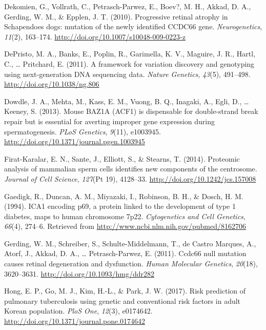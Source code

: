 \documentclass[12pt,twoside]{reedthesis}
\theoremstyle{definition}
\theoremstyle{definition}
\theoremstyle{remark}
\begin{document}
  \hypertarget{ref-Dekomien2010}{}
  Dekomien, G., Vollrath, C., Petrasch-Parwez, E., Boev?, M. H., Akkad, D.
  A., Gerding, W. M., \& Epplen, J. T. (2010). Progressive retinal atrophy
  in Schapendoes dogs: mutation of the newly identified CCDC66 gene.
  \emph{Neurogenetics}, \emph{11}(2), 163--174.
  \url{http://doi.org/10.1007/s10048-009-0223-z}
  
  \hypertarget{ref-DePristo2011}{}
  DePristo, M. A., Banks, E., Poplin, R., Garimella, K. V., Maguire, J.
  R., Hartl, C., \ldots{} Pritchard, E. (2011). A framework for variation
  discovery and genotyping using next-generation DNA sequencing data.
  \emph{Nature Genetics}, \emph{43}(5), 491--498.
  \url{http://doi.org/10.1038/ng.806}
  
  \hypertarget{ref-Dowdle2013}{}
  Dowdle, J. A., Mehta, M., Kass, E. M., Vuong, B. Q., Inagaki, A., Egli,
  D., \ldots{} Keeney, S. (2013). Mouse BAZ1A (ACF1) is dispensable for
  double-strand break repair but is essential for averting improper gene
  expression during spermatogenesis. \emph{PLoS Genetics}, \emph{9}(11),
  e1003945. \url{http://doi.org/10.1371/journal.pgen.1003945}
  
  \hypertarget{ref-Firat-Karalar2014}{}
  Firat-Karalar, E. N., Sante, J., Elliott, S., \& Stearns, T. (2014).
  Proteomic analysis of mammalian sperm cells identifies new components of
  the centrosome. \emph{Journal of Cell Science}, \emph{127}(Pt 19),
  4128--33. \url{http://doi.org/10.1242/jcs.157008}
  
  \hypertarget{ref-Gaedigk1994}{}
  Gaedigk, R., Duncan, A. M., Miyazaki, I., Robinson, B. H., \& Dosch, H.
  M. (1994). ICA1 encoding p69, a protein linked to the development of
  type 1 diabetes, maps to human chromosome 7p22. \emph{Cytogenetics and
  Cell Genetics}, \emph{66}(4), 274--6. Retrieved from
  \url{http://www.ncbi.nlm.nih.gov/pubmed/8162706}
  
  \hypertarget{ref-Gerding2011}{}
  Gerding, W. M., Schreiber, S., Schulte-Middelmann, T., de Castro
  Marques, A., Atorf, J., Akkad, D. A., \ldots{} Petrasch-Parwez, E.
  (2011). Ccdc66 null mutation causes retinal degeneration and
  dysfunction. \emph{Human Molecular Genetics}, \emph{20}(18), 3620--3631.
  \url{http://doi.org/10.1093/hmg/ddr282}
  
  \hypertarget{ref-Hong2017}{}
  Hong, E. P., Go, M. J., Kim, H.-L., \& Park, J. W. (2017). Risk
  prediction of pulmonary tuberculosis using genetic and conventional risk
  factors in adult Korean population. \emph{PloS One}, \emph{12}(3),
  e0174642. \url{http://doi.org/10.1371/journal.pone.0174642}
  
\end{document}
